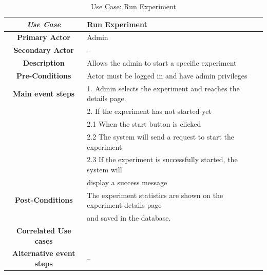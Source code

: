 \begin{table}[ht!]
    \centering
    \caption{Use Case: Run Experiment}
    \begin{tabularx}{\textwidth}{|Sl|S{X}|}
        \hline
        \textbf{\textit{Use Case}}       & \textbf{Run Experiment}                                                     \\ \hline
        \textbf{Primary Actor}           & Admin                                                                       \\ \hline
        \textbf{Secondary Actor}         & --                                                                          \\ \hline
        \textbf{Description}             & Allows the admin to start a specific experiment                             \\ \hline
        \textbf{Pre-Conditions}          & Actor must be logged in and have admin privileges                           \\ \hline
        \textbf{Main event steps}        & 1. Admin selects the experiment and reaches the details page.               \\
                                         & 2. If the experiment has not started yet                                         \\
                                         & \hspace{1em} 2.1 When the start button is clicked \\
                                         & \hspace{2.5em} 2.2 The system will send a request to start the experiment \\
                                         & \hspace{2.5em} 2.3 If the experiment is successfully started, the system will \\
                                         & \hspace{2.5em} display a success message \\ \hline
        \textbf{Post-Conditions}         & The experiment statistics are shown on the experiment details page          \\
                                         & and saved in the database.                                                  \\ \hline
        \textbf{Correlated Use cases}    &                                                                             \\ \hline
        \textbf{Alternative event steps} & --                                                                          \\ \hline
    \end{tabularx}
\end{table}

